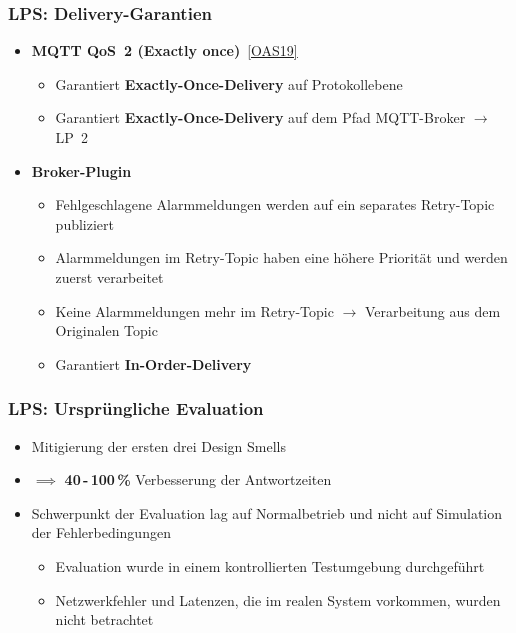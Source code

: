 \documentclass[11pt,aspectratio=1610]{beamer} %
\begin{document}
\begin{frame}
    \frametitle{LPS: Delivery-Garantien}

    \begin{itemize}
        \item \textbf{MQTT QoS~2 (Exactly once)}~\hyperlink{OAS19}{[OAS19]}
              \begin{itemize}
                  \item Garantiert \textbf{Exactly-Once-Delivery} auf Protokollebene
                  \item Garantiert \textbf{Exactly-Once-Delivery} auf dem Pfad MQTT-Broker $\rightarrow$ LP~2
              \end{itemize}
        \item \textbf{Broker-Plugin}
              \begin{itemize}
                  \item Fehlgeschlagene Alarmmeldungen werden auf ein separates Retry-Topic publiziert
                  \item Alarmmeldungen im Retry-Topic haben eine höhere Priorität und werden zuerst verarbeitet
                  \item Keine Alarmmeldungen mehr im Retry-Topic $\rightarrow$ Verarbeitung aus dem Originalen Topic
                  \item Garantiert \textbf{In-Order-Delivery}
              \end{itemize}
    \end{itemize}
\end{frame}

\begin{frame}
    \frametitle{LPS: Ursprüngliche Evaluation}

    \begin{itemize}
        \item Mitigierung der ersten drei Design Smells
        \item $\implies$ \textbf{40\,-\,100\,\%} Verbesserung der Antwortzeiten
        \item Schwerpunkt der Evaluation lag auf Normalbetrieb und nicht auf Simulation der Fehlerbedingungen
              \begin{itemize}
                  \item Evaluation wurde in einem kontrollierten Testumgebung durchgeführt
                  \item Netzwerkfehler und Latenzen, die im realen System vorkommen, wurden nicht betrachtet
              \end{itemize}
    \end{itemize}

\end{frame}
\end{document}
